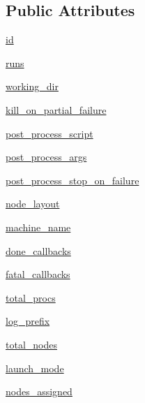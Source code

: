 \subsection*{Public Attributes}
\begin{DoxyCompactItemize}
\item 
\hyperlink{classcodar_1_1savanna_1_1model_1_1_pipeline_ac9d67caac17820b586b007df1411e3f8}{id}
\item 
\hyperlink{classcodar_1_1savanna_1_1model_1_1_pipeline_aceeec7aae018e27934619f797162d458}{runs}
\item 
\hyperlink{classcodar_1_1savanna_1_1model_1_1_pipeline_a2272c691cd2ecb1b11b581341cd5707c}{working\+\_\+dir}
\item 
\hyperlink{classcodar_1_1savanna_1_1model_1_1_pipeline_a8f831647499af6eae5696a85abc9a449}{kill\+\_\+on\+\_\+partial\+\_\+failure}
\item 
\hyperlink{classcodar_1_1savanna_1_1model_1_1_pipeline_a5539114ad7bace8f9753064e3d4a28ec}{post\+\_\+process\+\_\+script}
\item 
\hyperlink{classcodar_1_1savanna_1_1model_1_1_pipeline_a4568a89046b0fc45c5e6f3f5d80588a1}{post\+\_\+process\+\_\+args}
\item 
\hyperlink{classcodar_1_1savanna_1_1model_1_1_pipeline_aed4a93e26e62b1878c277a6d9a992fa9}{post\+\_\+process\+\_\+stop\+\_\+on\+\_\+failure}
\item 
\hyperlink{classcodar_1_1savanna_1_1model_1_1_pipeline_a32c1000ef2bf29a77c0f7ca8849adb64}{node\+\_\+layout}
\item 
\hyperlink{classcodar_1_1savanna_1_1model_1_1_pipeline_a7492ac83160febb20e9a60dad2a9233f}{machine\+\_\+name}
\item 
\hyperlink{classcodar_1_1savanna_1_1model_1_1_pipeline_a10bd363eae4d4b4e00c86fe26c2adedf}{done\+\_\+callbacks}
\item 
\hyperlink{classcodar_1_1savanna_1_1model_1_1_pipeline_a86657c62c6922840292d1f11e455016b}{fatal\+\_\+callbacks}
\item 
\hyperlink{classcodar_1_1savanna_1_1model_1_1_pipeline_a87f9ace8a7b25f52efa9e63821b8ea87}{total\+\_\+procs}
\item 
\hyperlink{classcodar_1_1savanna_1_1model_1_1_pipeline_a461a521150825c07864b23ff66c7cd69}{log\+\_\+prefix}
\item 
\hyperlink{classcodar_1_1savanna_1_1model_1_1_pipeline_ae5ea9a86523bdbbc9537a37b6d01436c}{total\+\_\+nodes}
\item 
\hyperlink{classcodar_1_1savanna_1_1model_1_1_pipeline_a93c4ea2d9b1714d9f78aba21c1507e95}{launch\+\_\+mode}
\item 
\hyperlink{classcodar_1_1savanna_1_1model_1_1_pipeline_ae821850c02f50972fa0edb2284ff9c59}{nodes\+\_\+assigned}
\end{DoxyCompactItemize}


